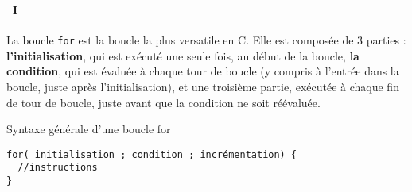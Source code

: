 \begin{frame}[containsverbatim]
  \frametitle{\secname}
  \framesubtitle{\subsecname~I}

  La boucle \verb|for| est la boucle la plus versatile en C. Elle est composée de 3 parties : \textbf{l'initialisation}, qui est exécuté une seule fois, au début de 
  la boucle, \textbf{la condition}, qui est évaluée à chaque tour de boucle (y compris à l'entrée dans la boucle, juste après l'initialisation), et une troisième partie, 
  exécutée à chaque fin de tour de boucle, juste avant que la condition ne soit réévaluée.
  \vspace{0.5cm}
  \begin{block}{Syntaxe générale d'une boucle for}
    \begin{verbatim}
for( initialisation ; condition ; incrémentation) {
  //instructions
}\end{verbatim}
  \end{block}
\end{frame}

